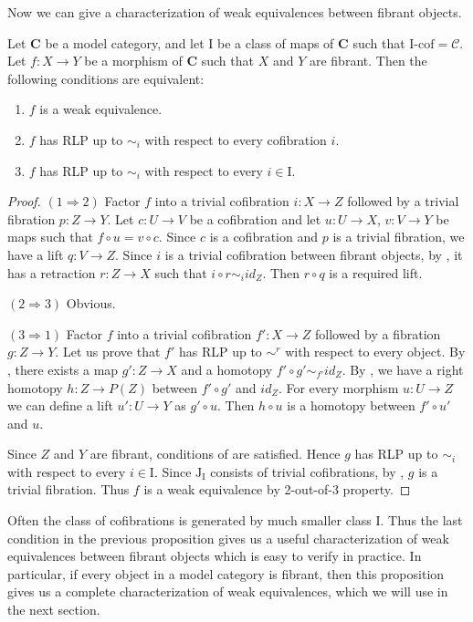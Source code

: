 \documentclass{tac}
\theoremstyle{definition}
\newcommand{\cof}{\mathcal{C}}
\newcommand{\cat}[1]{\mathbf{#1}}
\newcommand{\C}{\cat{C}}
\newcommand{\I}{\mathrm{I}}
\newcommand{\J}{\mathrm{J}}
\newcommand{\class}[2]{#1\text{-}\mathrm{#2}}
\newcommand{\Icof}[1][\I]{\class{#1}{cof}}
\begin{document}
Now we can give a characterization of weak equivalences between fibrant objects.

\begin{prop}[min-we]
Let $\C$ be a model category, and let $\I$ be a class of maps of $\C$ such that $\Icof = \cof$.
Let $f : X \to Y$ be a morphism of $\C$ such that $X$ and $Y$ are fibrant.
Then the following conditions are equivalent:
\begin{enumerate}
\item $f$ is a weak equivalence.
\item $f$ has RLP up to $\sim_i$ with respect to every cofibration $i$.
\item $f$ has RLP up to $\sim_i$ with respect to every $i \in \I$.
\end{enumerate}
\end{prop}
\begin{proof}
$(1 \Rightarrow 2)$
Factor $f$ into a trivial cofibration $i : X \to Z$ followed by a trivial fibration $p : Z \to Y$.
Let $c : U \to V$ be a cofibration and let $u : U \to X$, $v : V \to Y$ be maps such that $f \circ u = v \circ c$.
Since $c$ is a cofibration and $p$ is a trivial fibration, we have a lift $q : V \to Z$.
Since $i$ is a trivial cofibration between fibrant objects, by , it has a retraction $r : Z \to X$ such that $i \circ r \sim_i id_Z$.
Then $r \circ q$ is a required lift.

$(2 \Rightarrow 3)$ Obvious.

$(3 \Rightarrow 1)$
Factor $f$ into a trivial cofibration $f' : X \to Z$ followed by a fibration $g : Z \to Y$.
Let us prove that $f'$ has RLP up to $\sim^r$ with respect to every object.
By , there exists a map $g' : Z \to X$ and a homotopy $f' \circ g' \sim_{f'} id_Z$.
By , we have a right homotopy $h : Z \to P(Z)$ between $f' \circ g'$ and $id_Z$.
For every morphism $u : U \to Z$ we can define a lift $u' : U \to Y$ as $g' \circ u$.
Then $h \circ u$ is a homotopy between $f' \circ u'$ and $u$.

Since $Z$ and $Y$ are fibrant, conditions of  are satisfied.
Hence $g$ has RLP up to $\sim_i$ with respect to every $i \in \I$.
Since $\J_\I$ consists of trivial cofibrations, by , $g$ is a trivial fibration.
Thus $f$ is a weak equivalence by 2-out-of-3 property.
\end{proof}

Often the class of cofibrations is generated by much smaller class $\I$.
Thus the last condition in the previous proposition gives us a useful characterization of weak equivalences between fibrant objects which is easy to verify in practice.
In particular, if every object in a model category is fibrant, then this proposition gives us a complete characterization of weak equivalences, which we will use in the next section.
\end{document}
